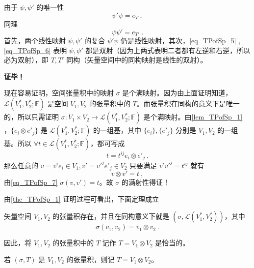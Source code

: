 由于 $\psi,\psi'$ 的唯一性
\begin{equation}\label{eq_TPofSp_5}
\psi'\psi=e_T~,
\end{equation}
同理
\begin{equation}\label{eq_TPofSp_6}
\psi\psi'=e_{T'}~.
\end{equation}
首先，两个线性映射 $\psi,\psi'$ 的复合 $\psi'\psi$ 仍是线性映射，其次，\autoref{eq_TPofSp_5} ,\autoref{eq_TPofSp_6} 表明 $\psi,\psi'$ 都是双射（因为上两式表明二者都有左逆和右逆，所以必为双射），即 $T,T'$ 同构（矢量空间中的同构映射是线性的双射）。

\textbf{证毕！}

现在容易证明，空间张量积中的映射 $\sigma$ 是个满映射。因为由上面证明知道，$\mathcal L(V_1^*,V_2^*;\mathbb F)$ 是空间 $V_1,V_2$ 的张量积中的 $T$。而张量积在同构的意义下是唯一的，所以只需证明 $\sigma:V_1\times V_2\rightarrow \mathcal L(V_1^*,V_2^*;\mathbb F)$ 是个满映射。由\autoref{lem_TPofSp_1} ，$\{e_i\otimes e'_j\}$ 是 $\mathcal L(V_1^*,V_2^*;\mathbb F)$ 的一组基，其中 $\{e_i\},\{e'_j\}$ 分别是 $V_1,V_2$ 的一组基。所以 $\forall t\in \mathcal L(V_1^*,V_2^*;\mathbb F)$，都可写成
\begin{equation}
t=t^{ij}e_i\otimes e'_j~.
\end{equation}
那么任意的 $v=v^i e_i\in V_1,v'=v'^j e'_j\in V_2$ 只要满足 $v^iv'^j=t^{ij}$ 就有
\begin{equation}
v\otimes v'=t~,
\end{equation}
由\autoref{eq_TPofSp_7} $\sigma(v,v')=t$。故 $\sigma$ 的满射性得证！

由\autoref{the_TPofSp_1} 证明过程可看出，下面定理成立
\begin{theorem}{}
矢量空间 $V_1,V_2$ 的张量积存在，并且在同构意义下就是 $(\sigma,\mathcal L(V_1^*,V_2^*))$，其中
\begin{equation}
\sigma(v_1,v_2)=v_1\otimes v_2~.
\end{equation}
\end{theorem}
 
 因此，将 $V_1,V_2$ 的张量积中的 $T$ 记作 $T=V_1\otimes V_2$ 是恰当的。

\begin{definition}{}
若 $(\sigma ,T)$ 是 $V_1,V_2$ 的张量积，则记 $T=V_1\otimes V_2$。
\end{definition}
